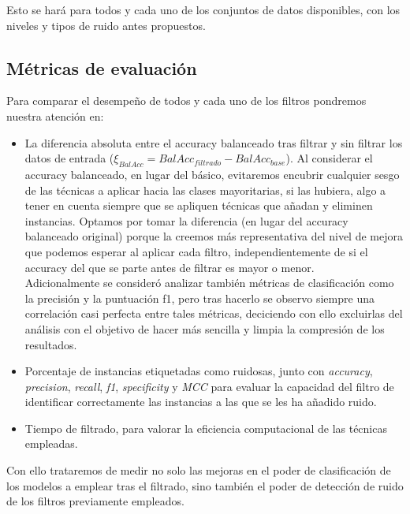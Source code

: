 \documentclass[print, color]{ugrTFG}
\begin{document}
 Esto se hará para todos y cada uno de los conjuntos de datos disponibles, con los niveles y tipos de ruido antes propuestos. \\


 \subsection{Métricas de evaluación}
 Para comparar el desempeño de todos y cada uno de los filtros pondremos nuestra atención en:
\begin{itemize}
    \item La diferencia absoluta entre el accuracy balanceado tras filtrar y sin filtrar los datos de entrada ($\xi_{BalAcc}=BalAcc_{filtrado}-BalAcc_{base}$). Al considerar el accuracy balanceado, en lugar del básico, evitaremos encubrir cualquier sesgo de las técnicas a aplicar hacia las clases mayoritarias, si las hubiera, algo a tener en cuenta siempre que se apliquen técnicas que añadan y eliminen instancias. Optamos por tomar la diferencia (en lugar del accuracy balanceado original) porque la creemos más representativa del nivel de mejora que podemos esperar al aplicar cada filtro, independientemente de si el accuracy del que se parte antes de filtrar es mayor o menor. \\
    Adicionalmente se consideró analizar también métricas de clasificación como la precisión y la puntuación f1, pero tras hacerlo se observo siempre una correlación casi perfecta entre tales métricas, deciciendo con ello excluirlas del análisis con el objetivo de hacer más sencilla y limpia la compresión de los resultados.


    \item Porcentaje de instancias etiquetadas como ruidosas, junto con \textit{accuracy}, \textit{precision}, \textit{recall}, \textit{f1}, \textit{specificity} y \textit{MCC} para evaluar la capacidad del filtro de identificar correctamente las instancias a las que se les ha añadido ruido.

    \item Tiempo de filtrado, para valorar la eficiencia computacional de las técnicas empleadas.
    
\end{itemize}
 Con ello trataremos de medir no solo las mejoras en el poder de clasificación de los modelos a emplear tras el filtrado, sino también el poder de detección de ruido de los filtros previamente empleados.\\

 
\end{document}
